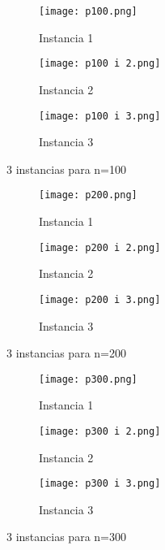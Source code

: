 \documentclass{article}
\begin{document}
\begin{figure}[H]
       \centering
       \begin{subfigure}[b]{0.49\linewidth}
           \texttt{[image: p100.png]}
           \caption{Instancia 1}
           \label{fig:westminster_lateral}
        \end{subfigure}
          \begin{subfigure}[b]{0.49\linewidth}
           \texttt{[image: p100 i 2.png]}
           \caption{Instancia 2}
           \label{fig:westminster_lateral}
        \end{subfigure}
       \begin{subfigure}[b]{0.49\linewidth}
           \texttt{[image: p100 i 3.png]}
           \caption{Instancia 3}
           \label{fig:westminster_lateral}
        \end{subfigure}   
        \caption{3 instancias para n=100}
        \label{fig:westminster}
\end{figure}

\begin{figure}[H]
       \centering
       \begin{subfigure}[b]{0.49\linewidth}
           \texttt{[image: p200.png]}
           \caption{Instancia 1}
           \label{fig:westminster_lateral}
        \end{subfigure}
          \begin{subfigure}[b]{0.49\linewidth}
           \texttt{[image: p200 i 2.png]}
           \caption{Instancia 2}
           \label{fig:westminster_lateral}
        \end{subfigure}
       \begin{subfigure}[b]{0.49\linewidth}
           \texttt{[image: p200 i 3.png]}
           \caption{Instancia 3}
           \label{fig:westminster_lateral}
        \end{subfigure}   
        \caption{3 instancias para n=200}
        \label{fig:westminster}
\end{figure}

\begin{figure}[H]
       \centering
       \begin{subfigure}[b]{0.49\linewidth}
           \texttt{[image: p300.png]}
           \caption{Instancia 1}
           \label{fig:westminster_lateral}
        \end{subfigure}
          \begin{subfigure}[b]{0.49\linewidth}
           \texttt{[image: p300 i 2.png]}
           \caption{Instancia 2}
           \label{fig:westminster_lateral}
        \end{subfigure}
       \begin{subfigure}[b]{0.49\linewidth}
           \texttt{[image: p300 i 3.png]}
           \caption{Instancia 3}
           \label{fig:westminster_lateral}
        \end{subfigure}   
        \caption{3 instancias para n=300}
        \label{fig:westminster}
\end{figure}
\end{document}
